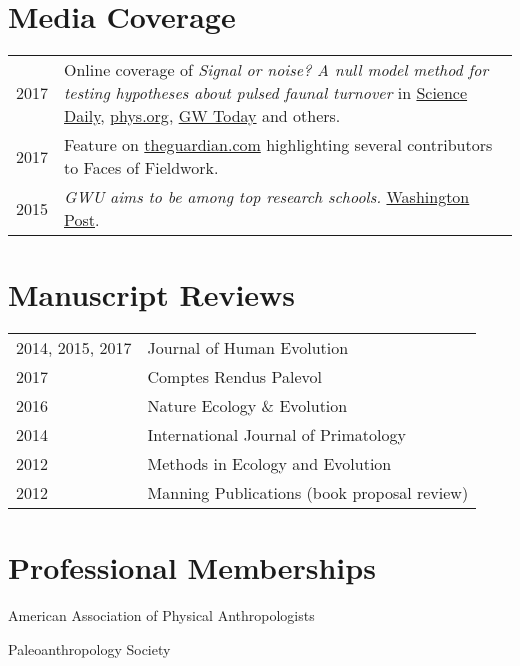 \documentclass{article}
\newenvironment{mylist}
{\begin{description}[style=unboxed,leftmargin=1.3cm]}
{\end{description}}
\begin{document}
\section*{Media Coverage}
\begin{longtable}{p{}p{}}
2017 &  Online coverage of \emph{Signal or noise? A null model method for testing hypotheses about pulsed faunal turnover} in \href{https://www.sciencedaily.com/releases/2017/08/170804100410.htm}{Science Daily}, \href{https://phys.org/news/2017-08-paper-genus-homo-response-environmental.html}{phys.org}, \href{https://gwtoday.gwu.edu/origin-human-genus-may-have-occurred-chance}{GW Today} and others. \\[4pt]
2017 & Feature on \href{https://www.theguardian.com/lifeandstyle/2017/jul/01/pregnant-in-the-field-blog-photography-have-trowel-will-travel}{theguardian.com} highlighting several contributors to Faces of Fieldwork.\\[4pt]
2015 & \emph{GWU aims to be among top research schools.} \href{http://www.washingtonpost.com/local/education/gwu-aims-to-be-among-top-research-schools/2015/03/03/491da24e-c1f1-11e4-9ec2-b418f57a4a99_gallery.html}{Washington Post}.\\
\end{longtable}

\section*{Manuscript Reviews}
\begin{tabular}{l l}
2014, 2015, 2017 & Journal of Human Evolution\\[4pt]
2017 & Comptes Rendus Palevol\\[4pt]
2016 & Nature Ecology \& Evolution\\[4pt]
2014 & International Journal of Primatology\\[4pt]
2012 & Methods in Ecology and Evolution\\[4pt]
2012 & Manning Publications (book proposal review)\\
\end{tabular}

\section*{Professional Memberships}
\begin{mylist}
\item[] American Association of Physical Anthropologists
\item[] Paleoanthropology Society
\end{mylist}
\end{document}
